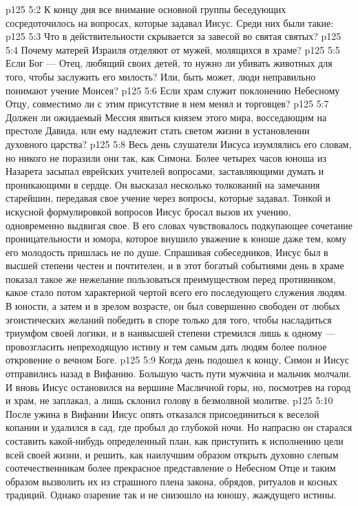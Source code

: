 \vs p125 5:2 К концу дня все внимание основной группы беседующих сосредоточилось на вопросах, которые задавал Иисус. Среди них были такие:
\vs p125 5:3 \bibnobreakspace Что в действительности скрывается за завесой во святая святых?
\vs p125 5:4 \pc {}\bibnobreakspace Почему матерей Израиля отделяют от мужей, молящихся в храме?
\vs p125 5:5 \pc {}\bibnobreakspace Если Бог --- Отец, любящий своих детей, то нужно ли убивать животных для того, чтобы заслужить его милость? Или, быть может, люди неправильно понимают учение Моисея?
\vs p125 5:6 \pc {}\bibnobreakspace Если храм служит поклонению Небесному Отцу, совместимо ли с этим присутствие в нем менял и торговцев?
\vs p125 5:7 \pc {}\bibnobreakspace Должен ли ожидаемый Мессия явиться князем этого мира, восседающим на престоле Давида, или ему надлежит стать светом жизни в установлении духовного царства?
\vs p125 5:8 \pc Весь день слушатели Иисуса изумлялись его словам, но никого не поразили они так, как Симона. Более четырех часов юноша из Назарета засыпал еврейских учителей вопросами, заставляющими думать и проникающими в сердце. Он высказал несколько толкований на замечания старейшин, передавая свое учение через вопросы, которые задавал. Тонкой и искусной формулировкой вопросов Иисус бросал вызов их учению, одновременно выдвигая свое. В его словах чувствовалось подкупающее сочетание проницательности и юмора, которое внушило уважение к юноше даже тем, кому его молодость пришлась не по душе. Спрашивая собеседников, Иисус был в высшей степени честен и почтителен, и в этот богатый событиями день в храме показал такое же нежелание пользоваться преимуществом перед противником, какое стало потом характерной чертой всего его последующего служения людям. В юности, а затем и в зрелом возрасте, он был совершенно свободен от любых эгоистических желаний победить в споре только для того, чтобы насладиться триумфом своей логики, и в наивысшей степени стремился лишь к одному --- провозгласить непреходящую истину и тем самым дать людям более полное откровение о вечном Боге.
\vs p125 5:9 \pc Когда день подошел к концу, Симон и Иисус отправились назад в Вифанию. Большую часть пути мужчина и мальчик молчали. И вновь Иисус остановился на вершине Масличной горы, но, посмотрев на город и храм, не заплакал, а лишь склонил голову в безмолвной молитве.
\vs p125 5:10 После ужина в Вифании Иисус опять отказался присоединиться к веселой копании и удалился в сад, где пробыл до глубокой ночи. Но напрасно он старался составить какой\hyp{}нибудь определенный план, как приступить к исполнению цели всей своей жизни, и решить, как наилучшим образом открыть духовно слепым соотечественникам более прекрасное представление о Небесном Отце и таким образом вызволить их из страшного плена закона, обрядов, ритуалов и косных традиций. Однако озарение так и не снизошло на юношу, жаждущего истины.
